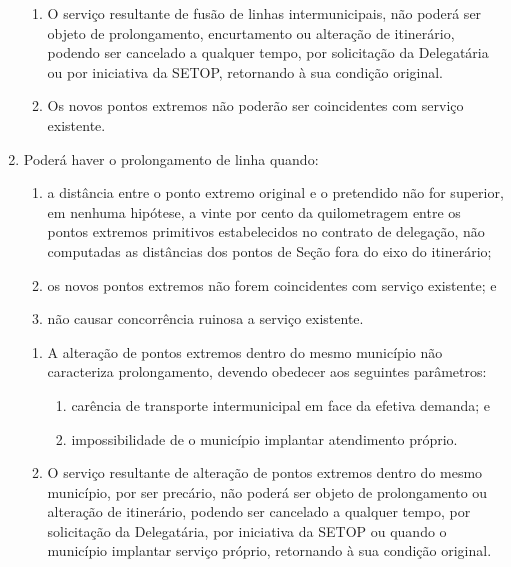 \begin{enumerate}[resume, label=Art. \arabic*]
\begin{enumerate}[label= \S \arabic*]
\item O serviço resultante de fusão de linhas intermunicipais, não poderá ser objeto de prolongamento, encurtamento ou alteração de itinerário, podendo ser cancelado a qualquer tempo, por solicitação da Delegatária ou por iniciativa da SETOP, retornando à sua condição original.

\item Os novos pontos extremos não poderão ser coincidentes com serviço existente.

\end{enumerate}

\item Poderá haver o prolongamento de linha quando:

\begin{enumerate}[label=\roman*.]

\item a distância entre o ponto extremo original e o pretendido não for superior, em nenhuma hipótese, a vinte por cento da quilometragem entre os pontos extremos primitivos estabelecidos no contrato de delegação, não computadas as distâncias dos pontos de Seção fora do eixo do itinerário;

\item os novos pontos extremos não forem coincidentes com serviço existente; e

\item não causar concorrência ruinosa a serviço existente.

\end{enumerate}

\begin{enumerate}[label= \S \arabic*] %

\item A alteração de pontos extremos dentro do mesmo município não caracteriza prolongamento, devendo obedecer aos seguintes parâmetros:

\begin{enumerate}[label=\roman*.]

\item carência de transporte intermunicipal em face da efetiva demanda; e

\item impossibilidade de o município implantar atendimento próprio.

\end{enumerate}

\item O serviço resultante de alteração de pontos extremos dentro do mesmo município, por ser precário, não poderá ser objeto de prolongamento ou alteração de itinerário, podendo ser cancelado a qualquer tempo, por solicitação da Delegatária, por iniciativa da SETOP ou quando o município implantar serviço próprio, retornando à sua condição original.


\end{enumerate}
\end{enumerate}
